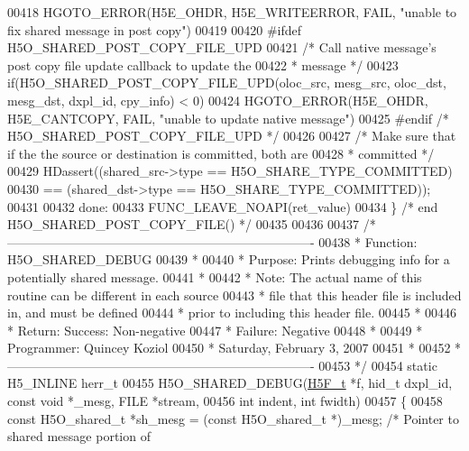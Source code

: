 \begin{DoxyCode}
00418         HGOTO\_ERROR(H5E\_OHDR, H5E\_WRITEERROR, FAIL, \textcolor{stringliteral}{"unable to fix shared message in post copy"})
00419 
00420 \textcolor{preprocessor}{#ifdef H5O\_SHARED\_POST\_COPY\_FILE\_UPD}
00421     \textcolor{comment}{/* Call native message's post copy file update callback to update the}
00422 \textcolor{comment}{     * message */}
00423     \textcolor{keywordflow}{if}(H5O\_SHARED\_POST\_COPY\_FILE\_UPD(oloc\_src, mesg\_src, oloc\_dst, mesg\_dst, dxpl\_id, cpy\_info) < 0)
00424         HGOTO\_ERROR(H5E\_OHDR, H5E\_CANTCOPY, FAIL, \textcolor{stringliteral}{"unable to update native message"})
00425 \textcolor{preprocessor}{#endif }\textcolor{comment}{/* H5O\_SHARED\_POST\_COPY\_FILE\_UPD */}\textcolor{preprocessor}{}
00426 
00427     \textcolor{comment}{/* Make sure that if the the source or destination is committed, both are}
00428 \textcolor{comment}{     * committed */}
00429     HDassert((shared\_src->type == H5O\_SHARE\_TYPE\_COMMITTED)
00430             == (shared\_dst->type == H5O\_SHARE\_TYPE\_COMMITTED));
00431 
00432 done:
00433     FUNC\_LEAVE\_NOAPI(ret\_value)
00434 \} \textcolor{comment}{/* end H5O\_SHARED\_POST\_COPY\_FILE() */}
00435 
00436 
00437 \textcolor{comment}{/*-------------------------------------------------------------------------}
00438 \textcolor{comment}{ * Function:    H5O\_SHARED\_DEBUG}
00439 \textcolor{comment}{ *}
00440 \textcolor{comment}{ * Purpose:     Prints debugging info for a potentially shared message.}
00441 \textcolor{comment}{ *}
00442 \textcolor{comment}{ * Note:    The actual name of this routine can be different in each source}
00443 \textcolor{comment}{ *      file that this header file is included in, and must be defined}
00444 \textcolor{comment}{ *      prior to including this header file.}
00445 \textcolor{comment}{ *}
00446 \textcolor{comment}{ * Return:  Success:    Non-negative}
00447 \textcolor{comment}{ *      Failure:    Negative}
00448 \textcolor{comment}{ *}
00449 \textcolor{comment}{ * Programmer:  Quincey Koziol}
00450 \textcolor{comment}{ *              Saturday, February  3, 2007}
00451 \textcolor{comment}{ *}
00452 \textcolor{comment}{ *-------------------------------------------------------------------------}
00453 \textcolor{comment}{ */}
00454 \textcolor{keyword}{static} H5\_INLINE herr\_t
00455 H5O\_SHARED\_DEBUG(\hyperlink{struct_h5_f__t}{H5F\_t} *f, hid\_t dxpl\_id, \textcolor{keyword}{const} \textcolor{keywordtype}{void} *\_mesg, FILE *stream,
00456     \textcolor{keywordtype}{int} indent, \textcolor{keywordtype}{int} fwidth)
00457 \{
00458     \textcolor{keyword}{const} H5O\_shared\_t *sh\_mesg = (\textcolor{keyword}{const} H5O\_shared\_t *)\_mesg;     \textcolor{comment}{/* Pointer to shared message portion of
}
\end{DoxyCode}
